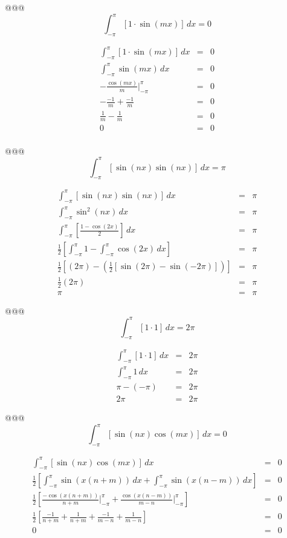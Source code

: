 \documentclass[10pt]{article}
\begin{document}
\begin{easylist}[enumerate]
    @@@ \[ \int_{-\pi}^\pi \left[ 1 \cdot \sin(mx) \right] \, dx = 0 \]

    \begin{align*}
        \int_{-\pi}^\pi \left[ 1 \cdot \sin(mx) \right] \, dx &=& 0\\
        \int_{-\pi}^\pi \sin(mx) \, dx &=& 0\\
        -\frac{\cos(mx)}{m} \bigg|_{-\pi}^\pi &=& 0\\
        -\frac{-1}{m} + \frac{-1}{m} &=& 0\\
        \frac{1}{m} - \frac{1}{m} &=& 0\\
        0 &=& 0\\
    \end{align*}

    @@@ \[ \int_{-\pi}^\pi \left[ \sin(nx) \sin(nx) \right] \, dx = \pi \]

    \begin{align*}
        \int_{-\pi}^\pi \left[ \sin(nx) \sin(nx) \right] \, dx &=& \pi\\
        \int_{-\pi}^\pi \sin^2(nx) \, dx &=& \pi\\
        \int_{-\pi}^\pi \left[ \frac{1 - \cos(2x)}{2} \right] \, dx &=& \pi\\
        \frac{1}{2} \left[ \int_{-\pi}^\pi 1 - \int_{-\pi}^\pi \cos(2x) \, dx \right] &=& \pi\\
        \frac{1}{2} \left[ (2 \pi) - \left( \frac{1}{2} \left[ \sin(2 \pi) - \sin(-2 \pi) \right] \right) \right] &=& \pi\\
        \frac{1}{2} ( 2 \pi ) &=& \pi\\
        \pi &=& \pi
    \end{align*}

    @@@ \[ \int_{-\pi}^\pi \left[ 1 \cdot 1 \right] \, dx = 2 \pi \]

    \begin{align*}
        \int_{-\pi}^\pi \left[ 1 \cdot 1 \right] \, dx &=& 2 \pi\\
        \int_{-\pi}^\pi 1 \, dx &=& 2 \pi\\
        \pi - (- \pi) &=& 2 \pi\\
        2 \pi &=& 2\pi
    \end{align*}

    @@@ \[ \int_{-\pi}^\pi \left[ \sin(nx) \cos(mx) \right] \, dx = 0 \]

    \begin{align*}
        \int_{-\pi}^\pi \left[ \sin(nx) \cos(mx) \right] \, dx &=& 0\\
        \frac{1}{2} \left[ \int_{-\pi}^\pi \sin(x(n + m)) \, dx + \int_{-\pi}^\pi \sin(x(n - m)) \, dx \right] &=& 0\\
        \frac{1}{2} \left[ \frac{-\cos(x(n+m))}{n+m} \bigg|_{-\pi}^\pi +
            \frac{\cos(x(n-m))}{m-n} \bigg|_{-\pi}^\pi \right] &=& 0\\
        \frac{1}{2} \left[ \frac{-1}{n+m} + \frac{1}{n+m} + \frac{-1}{m-n} + \frac{1}{m-n} \right] &=& 0\\
        0 &=& 0\\
    \end{align*}


\end{easylist}
\end{document}

